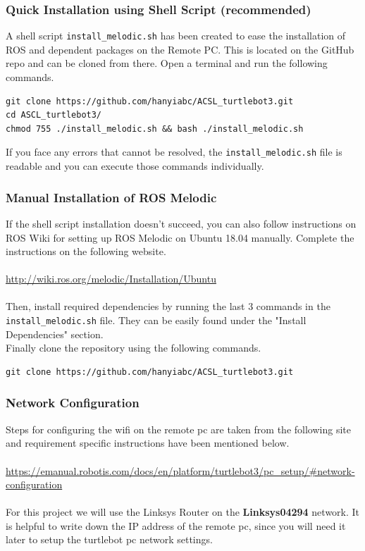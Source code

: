 \documentclass[12]{article}
\begin{document}
\subsubsection{Quick Installation using Shell Script (recommended)}
A shell script \texttt{install\_melodic.sh} has been created to ease the installation of ROS and dependent packages on the Remote PC. This is located on the GitHub repo and can be cloned from there. Open a terminal and run the following commands.
\begin{lstlisting}[style=bash]
git clone https://github.com/hanyiabc/ACSL_turtlebot3.git
cd ASCL_turtlebot3/
chmod 755 ./install_melodic.sh && bash ./install_melodic.sh
\end{lstlisting}
If you face any errors that cannot be resolved, the \texttt{install\_melodic.sh} file is readable and you can execute those commands individually.
\subsubsection{Manual Installation of ROS Melodic}
If the shell script installation doesn't succeed, you can also follow instructions on ROS Wiki for setting up ROS Melodic on Ubuntu 18.04 manually. Complete the instructions on the following website.\\\\
\url{http://wiki.ros.org/melodic/Installation/Ubuntu}\\\\
Then, install required dependencies by running the last 3 commands in the \texttt{install\_melodic.sh} file. They can be easily found under the "Install Dependencies" section.\\
Finally clone the repository using the following commands.
\begin{lstlisting}[style=bash]
git clone https://github.com/hanyiabc/ACSL_turtlebot3.git
\end{lstlisting}
\subsubsection{Network Configuration}
Steps for configuring the wifi on the remote pc are taken from the following site and requirement specific instructions have been mentioned below.\\\\
\url {https://emanual.robotis.com/docs/en/platform/turtlebot3/pc_setup/#network-configuration}\\\\
For this project we will use the Linksys Router on the \textbf{Linksys04294} network. It is helpful to write down the IP address of the remote pc, since you will need it later to setup the turtlebot pc network settings.
\end{document}
